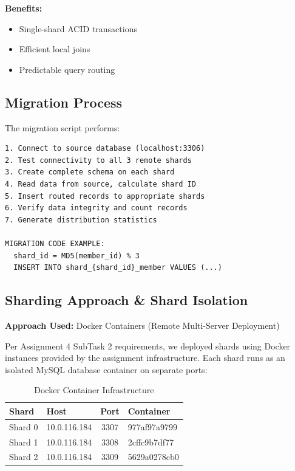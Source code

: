 \documentclass[12pt,a4paper]{article}
\begin{document}
\textbf{Benefits:}
\begin{itemize}
    \item Single-shard ACID transactions
    \item Efficient local joins
    \item Predictable query routing
\end{itemize}

\subsection{Migration Process}

The migration script performs:

\begin{lstlisting}[caption=Migration Steps]
1. Connect to source database (localhost:3306)
2. Test connectivity to all 3 remote shards
3. Create complete schema on each shard
4. Read data from source, calculate shard ID
5. Insert routed records to appropriate shards
6. Verify data integrity and count records
7. Generate distribution statistics

MIGRATION CODE EXAMPLE:
  shard_id = MD5(member_id) % 3
  INSERT INTO shard_{shard_id}_member VALUES (...)
\end{lstlisting}

\subsection{Sharding Approach \& Shard Isolation}

\textbf{Approach Used:} Docker Containers (Remote Multi-Server Deployment)

Per Assignment 4 SubTask 2 requirements, we deployed shards using Docker instances provided by the assignment infrastructure. Each shard runs as an isolated MySQL database container on separate ports:

\begin{table}[H]
\centering
\begin{tabularx}{\textwidth}{|l|l|c|l|}
\hline
\textbf{Shard} & \textbf{Host} & \textbf{Port} & \textbf{Container} \\
\hline
Shard 0 & 10.0.116.184 & 3307 & 977af97a9799 \\
Shard 1 & 10.0.116.184 & 3308 & 2cffc9b7df77 \\
Shard 2 & 10.0.116.184 & 3309 & 5629a0278cb0 \\
\hline
\end{tabularx}
\caption{Docker Container Infrastructure}
\end{table}
\end{document}
